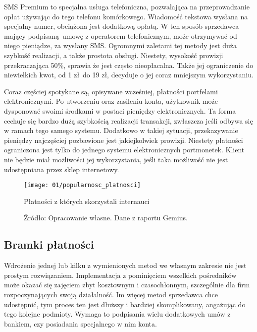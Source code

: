 SMS Premium to specjalna usługa telefoniczna, pozwalająca na przeprowadzanie opłat używając do tego telefonu komórkowego. Wiadomość tekstowa wysłana na specjalny numer, obciążona jest dodatkową opłatą. W ten sposób sprzedawca mający podpisaną umowę z operatorem telefonicznym, może otrzymywać od niego pieniądze, za wysłany SMS. Ogromnymi zaletami tej metody jest duża szybkość realizacji, a także prostota obsługi. Niestety, wysokość prowizji przekraczająca 50\%, sprawia że jest często nieopłacalna. Także jej ograniczenie do niewielkich kwot, od 1 zł do 19 zł, decyduje o jej coraz mniejszym wykorzystaniu.

Coraz częściej spotykane są, opisywane wcześniej, płatności portfelami elektronicznymi. Po utworzeniu oraz zasileniu konta, użytkownik może dysponować swoimi środkami w postaci pieniędzy elektronicznych. Ta forma cechuje się bardzo dużą szybkością realizacji transakcji, zwłaszcza jeśli odbywa się w ramach tego samego systemu. Dodatkowo w takiej sytuacji, przekazywanie pieniędzy najczęściej pozbawione jest jakiejkolwiek prowizji. Niestety płatności ograniczona jest tylko do jednego systemu elektronicznych portmonetek. Klient nie będzie miał możliwości jej wykorzystania, jeśli taka możliwość nie jest udostępniana przez sklep internetowy.

\begin{figure}[h]
	\begin{center}
		\texttt{[image: 01/popularnosc\_platnosci]}
	\end{center}
	\caption{Płatności z których skorzystali internauci}
	\vspace{-0.4cm}
	\caption*{Źródło: Opracowanie własne. Dane z raportu Gemius. \cite{raport-ecommerce2014}}
\end{figure}

\subsection{Bramki płatności}

Wdrożenie jednej lub kilku z wymienionych metod we własnym zakresie nie jest prostym rozwiązaniem. Implementacja z pominięciem wszelkich pośredników może okazać się zajęciem zbyt kosztownym i czasochłonnym, szczególnie dla firm rozpoczynających swoją działalność. Im więcej metod sprzedawca chce udostępnić, tym proces ten jest dłuższy i bardziej skomplikowany, angażując do tego kolejne podmioty. Wymaga to podpisania wielu dodatkowych umów z bankiem, czy posiadania specjalnego w nim konta. 


